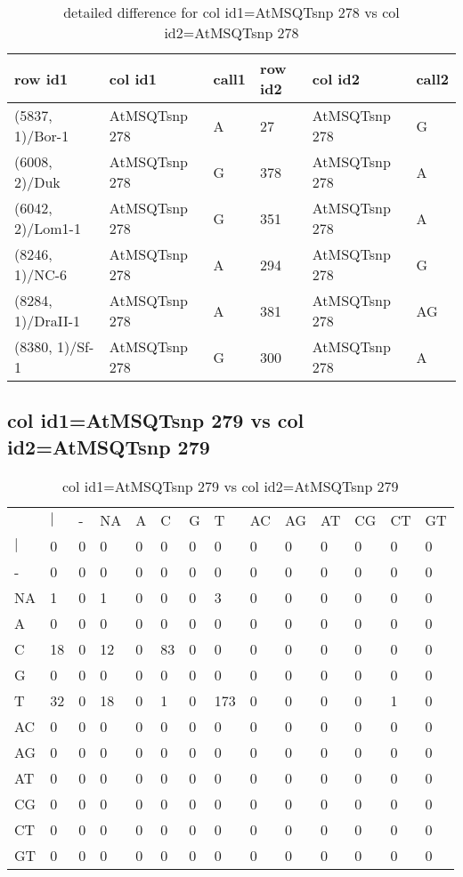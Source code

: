 \begin{center}
\begin{longtable}{|l|l|l|l|l|l|}
\caption{detailed difference for col id1=AtMSQTsnp 278 vs col id2=AtMSQTsnp 278} \label{table_dm819}\\
\hline
row id1&col id1&call1&row id2&col id2&call2\\
\hline
(5837, 1)/Bor-1&AtMSQTsnp 278&A&27&AtMSQTsnp 278&G\\
(6008, 2)/Duk&AtMSQTsnp 278&G&378&AtMSQTsnp 278&A\\
(6042, 2)/Lom1-1&AtMSQTsnp 278&G&351&AtMSQTsnp 278&A\\
(8246, 1)/NC-6&AtMSQTsnp 278&A&294&AtMSQTsnp 278&G\\
(8284, 1)/DraII-1&AtMSQTsnp 278&A&381&AtMSQTsnp 278&AG\\
(8380, 1)/Sf-1&AtMSQTsnp 278&G&300&AtMSQTsnp 278&A\\
\hline
\end{longtable}
\end{center}

\subsection{col id1=AtMSQTsnp 279 vs col id2=AtMSQTsnp 279}
\begin{center}
\begin{longtable}{|l|l|l|l|l|l|l|l|l|l|l|l|l|l|}
\caption{col id1=AtMSQTsnp 279 vs col id2=AtMSQTsnp 279} \label{table_dm820}\\
\hline
\\
\hline
&$|$&-&NA&A&C&G&T&AC&AG&AT&CG&CT&GT\\
$|$&0&0&0&0&0&0&0&0&0&0&0&0&0\\
-&0&0&0&0&0&0&0&0&0&0&0&0&0\\
NA&1&0&1&0&0&0&3&0&0&0&0&0&0\\
A&0&0&0&0&0&0&0&0&0&0&0&0&0\\
C&18&0&12&0&83&0&0&0&0&0&0&0&0\\
G&0&0&0&0&0&0&0&0&0&0&0&0&0\\
T&32&0&18&0&1&0&173&0&0&0&0&1&0\\
AC&0&0&0&0&0&0&0&0&0&0&0&0&0\\
AG&0&0&0&0&0&0&0&0&0&0&0&0&0\\
AT&0&0&0&0&0&0&0&0&0&0&0&0&0\\
CG&0&0&0&0&0&0&0&0&0&0&0&0&0\\
CT&0&0&0&0&0&0&0&0&0&0&0&0&0\\
GT&0&0&0&0&0&0&0&0&0&0&0&0&0\\
\hline
\end{longtable}
\end{center}


